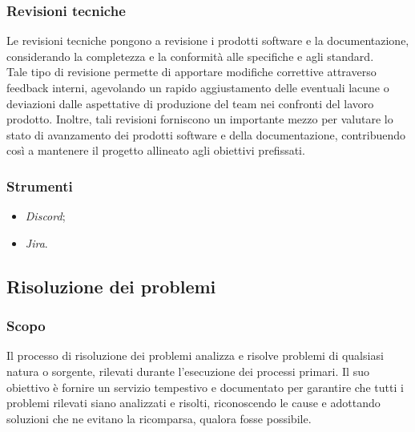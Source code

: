 \documentclass[10pt, a4paper]{article}
\begin{document}
\subsubsection{Revisioni tecniche}
Le revisioni tecniche pongono a revisione i prodotti software e la documentazione, considerando la completezza e la conformità alle specifiche e agli standard.\\
Tale tipo di revisione permette di apportare modifiche correttive attraverso feedback interni, agevolando un rapido aggiustamento delle eventuali lacune o deviazioni
dalle aspettative di produzione del team nei confronti del lavoro prodotto. Inoltre, tali revisioni forniscono un importante 
mezzo per valutare lo stato di avanzamento dei prodotti software e della documentazione, contribuendo così a mantenere il progetto allineato agli obiettivi prefissati.

\subsubsection{Strumenti}
\begin{itemize}
    \item \textit{Discord};
    \item \textit{Jira}.
\end{itemize}

\subsection{Risoluzione dei problemi}
\subsubsection{Scopo}
Il processo di risoluzione dei problemi analizza e risolve problemi di qualsiasi natura o sorgente, rilevati durante l'esecuzione dei processi primari.
Il suo obiettivo è fornire un servizio tempestivo e documentato per garantire che tutti i problemi rilevati siano analizzati e risolti, riconoscendo le 
cause e adottando soluzioni che ne evitano la ricomparsa, qualora fosse possibile.
\end{document}
